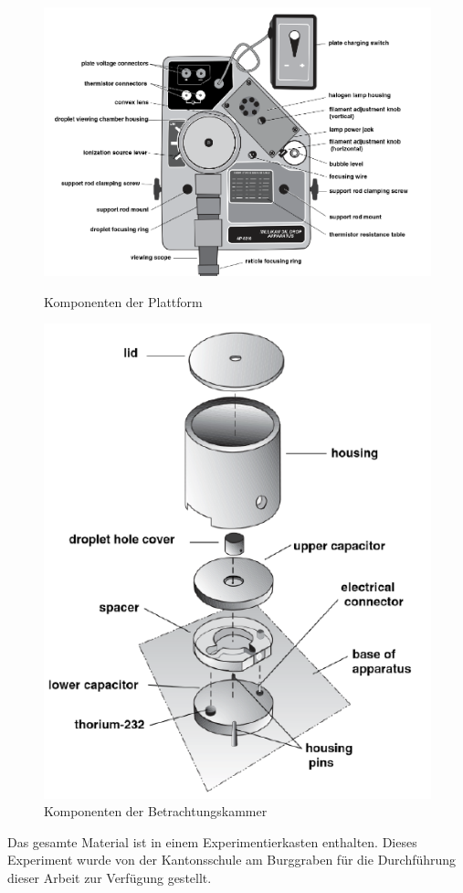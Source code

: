 \begin{figure}[h]
	\centering
	\begin{minipage}[t]{0.45\textwidth}
		\centering
		\includegraphics[scale=0.5]{bilder/pdf/plattformKomponenten.pdf}
		\caption{Komponenten der Plattform}
		\label{fig:plattformKomp}
	\end{minipage}
	\hfill
	\begin{minipage}[t]{0.45\textwidth}
		\centering
		\includegraphics[width=\textwidth]{bilder/pdf/BetrachtungsKammerKomponenten.pdf}
		\caption{Komponenten der Betrachtungskammer}
		\label{fig:betrachtKomp}
	\end{minipage}
\end{figure}

\noindent Das gesamte Material ist in einem Experimentierkasten enthalten. Dieses Experiment wurde von der Kantonsschule am Burggraben für die Durchführung dieser Arbeit zur Verfügung gestellt.





